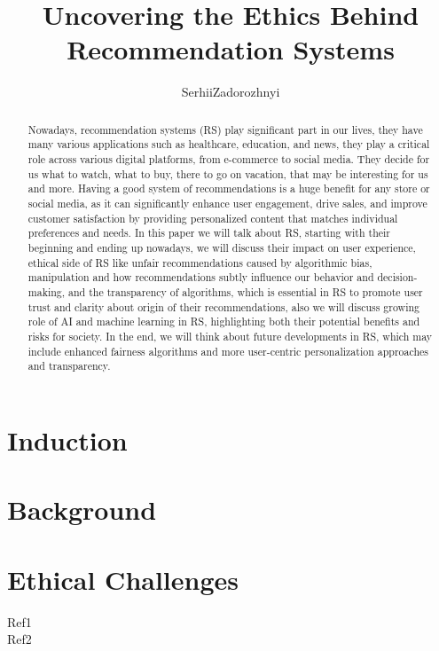 \documentclass{article}
\title{Uncovering the Ethics Behind Recommendation Systems}
\author{Serhii\;Zadorozhnyi}
\begin{document}
\maketitle
\textbf{}
\begin{abstract}
Nowadays, recommendation systems (RS) play significant part in our lives, they have many various applications such as healthcare, education, and news, they play a critical role across various digital platforms, from e-commerce to social media. They decide for us what to watch, what to buy, there to go on vacation, that may be interesting for us and more. Having a good system of recommendations is a huge benefit for any store or social media, as it can significantly enhance user engagement, drive sales, and improve customer satisfaction by providing personalized content that matches individual preferences and needs. In this paper we will talk about RS, starting with their beginning and ending up nowadays, we will discuss their impact on user experience, ethical side of RS like unfair recommendations caused by algorithmic bias, manipulation and how recommendations subtly influence our behavior and decision-making, and the transparency of algorithms, which is essential in RS to promote user trust and clarity about origin of their recommendations, also we will discuss growing role of AI and machine learning in RS, highlighting both their potential benefits and risks for society. In the end, we will think about future developments in RS, which may include enhanced fairness algorithms and more user-centric personalization approaches and transparency.
\end{abstract}


\section{Induction}
\section{Background}
\section{Ethical Challenges}

Ref1\cite{9904386}\\Ref2\cite{7956539}


\end{document}
